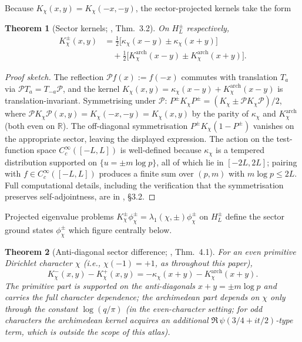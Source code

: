 \documentclass[10pt,twocolumn]{article}
\newtheorem{theorem}{Theorem}[section]
\theoremstyle{definition}
\theoremstyle{remark}
\newcommand{\chifn}{\chi}
\begin{document}
Because $K_{\chifn}(x,y)=K_{\chifn}(-x,-y)$, the sector-projected
kernels take the form
\begin{theorem}[Sector kernels; {\cite{AnalyticKernel}, Thm.~3.2}]
\label{thm:kernel}
On $H_L^\pm$ respectively,
\[
\begin{aligned}
  K_{\chifn}^{\pm}(x,y)
    &=\tfrac{1}{2}\bigl[\kappa_{\chifn}(x-y)
       \pm\kappa_{\chifn}(x+y)\bigr]\\
    &\quad+\tfrac{1}{2}\bigl[K^{\mathrm{arch}}_{\chifn}(x-y)
       \pm K^{\mathrm{arch}}_{\chifn}(x+y)\bigr].
\end{aligned}
\]
\end{theorem}

\begin{proof}[Proof sketch]
The reflection $\mathcal{P}f(x):=f(-x)$ commutes with translation
$T_a$ via $\mathcal{P}T_a=T_{-a}\mathcal{P}$, and the kernel
$K_\chi(x,y)=\kappa_\chi(x-y)+K^{\mathrm{arch}}_\chi(x-y)$ is
translation-invariant. Symmetrising under $\mathcal{P}$:
$P^\pm K_\chi P^\pm=(K_\chi\pm\mathcal{P}K_\chi\mathcal{P})/2$,
where $\mathcal{P}K_\chi\mathcal{P}(x,y)=K_\chi(-x,-y)=K_\chi(x,y)$
by the parity of $\kappa_\chi$ and $K^{\mathrm{arch}}_\chi$ (both
even on $\mathbb{R}$). The off-diagonal symmetrisation
$P^\pm K_\chi(1-P^\pm)$ vanishes on the appropriate sector, leaving
the displayed expression. The action on the test-function space
$C_c^\infty([-L,L])$ is well-defined because $\kappa_\chi$ is a
tempered distribution supported on $\{u=\pm m\log p\}$, all of which
lie in $[-2L,2L]$; pairing with $f\in C_c^\infty([-L,L])$ produces a
finite sum over $(p,m)$ with $m\log p\leq 2L$. Full computational
details, including the verification that the symmetrisation
preserves self-adjointness, are in \cite{AnalyticKernel}, \S3.2.
\end{proof}

Projected eigenvalue problems
$K_{\chifn}^{\pm}\phi_{\chifn}^{\pm}=\lambda_1(\chifn,\pm)\phi_{\chifn}^{\pm}$
on $H_L^\pm$ define the sector ground states $\phi_{\chifn}^\pm$
which figure centrally below.

\begin{theorem}[Anti-diagonal sector difference; {\cite{AnalyticKernel}, Thm.~4.1}]
\label{thm:sector-diff}
For an even primitive Dirichlet character $\chifn$ (i.e.,
$\chifn(-1)=+1$, as throughout this paper),
\[
  K_{\chifn}^-(x,y)-K_{\chifn}^+(x,y)
    =-\kappa_{\chifn}(x+y)-K^{\mathrm{arch}}_{\chifn}(x+y).
\]
The primitive part is supported on the anti-diagonals $x+y=\pm m\log
p$ and carries the full character dependence; the archimedean part
depends on $\chifn$ only through the constant $\log(q/\pi)$ (in the
even-character setting; for odd characters the archimedean kernel
acquires an additional $\Re\,\psi(3/4+it/2)$-type term, which is
outside the scope of this atlas).
\end{theorem}
\end{document}

